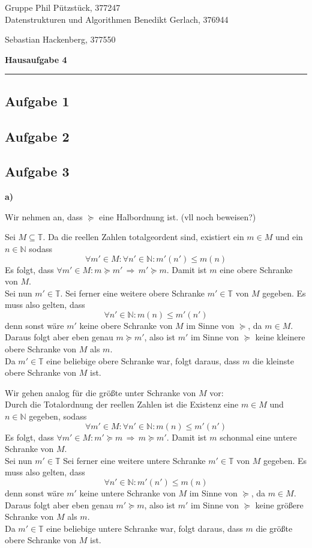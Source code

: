 \documentclass[a4paper,graphics,11pt]{article}
\newcommand{\aufgabe}[1]{\subsection*{Aufgabe #1}}
\begin{document}
\noindent Gruppe              \hfill Phil Pützstück, 377247\\
\noindent Datenstrukturen und Algorithmen \hfill Benedikt Gerlach, 376944\\
\strut\hfill Sebastian Hackenberg, 377550\\
\begin{center}
	\LARGE{\textbf{Hausaufgabe 4}}
\end{center}
\begin{center}
\rule[0.1ex]{\textwidth}{1pt}
\end{center}

\aufgabe{1}
\newpage
\aufgabe{2}
\newpage
\aufgabe{3}
\textbf{a)}

Wir nehmen an, dass $\succeq$ eine Halbordnung ist. (vll noch beweisen?)

Sei $M \subseteq \mathbb{T}$. Da die reellen Zahlen totalgeordent sind, existiert ein
$m \in M$ und ein $n \in \mathbb{N}$ sodass
$$
    \forall m' \in M : \forall n' \in \mathbb{N} : m'(n') \leq m(n)
$$
Es folgt, dass $\forall m' \in M : m \succeq m' \,\Longrightarrow\, m' \succeq m$.
Damit ist $m$ eine obere Schranke von $M$.\\
Sei nun $m' \in \mathbb{T}$. Sei ferner eine weitere obere Schranke $m' \in \mathbb{T}$ von $M$ gegeben.
Es muss also gelten, dass
\begin{equation}
    \forall n' \in \mathbb{N} : m(n) \leq m'(n')
\end{equation}
denn sonst wäre $m'$ keine obere Schranke von $M$ im Sinne von $\succeq$, da $m \in M$.
Daraus folgt aber eben genau $m \succeq m'$, also ist $m'$ im Sinne von $\succeq$ keine 
kleinere obere Schranke von $M$ als $m$.\\
Da $m' \in \mathbb{T}$ eine beliebige obere Schranke war, folgt daraus, dass $m$ die kleinste obere Schranke von $M$ ist.

Wir gehen analog für die größte unter Schranke von $M$ vor:\\
Durch die Totalordnung der reellen Zahlen ist die Existenz eine $m \in M$ und $n \in \mathbb{N}$
gegeben, sodass
$$
    \forall m' \in M : \forall n' \in \mathbb{N} : m(n) \leq m'(n')
$$
Es folgt, dass $\forall m' \in M : m' \succeq m \,\Longrightarrow\, m \succeq m'$. Damit ist $m$ schonmal eine untere Schranke von $M$.\\
Sei nun $m' \in \mathbb{T}$ Sei ferner eine weitere untere Schranke $m' \in \mathbb{T}$ von $M$ gegeben.
Es muss also gelten, dass
$$
    \forall n' \in \mathbb{N} : m'(n') \leq m(n)
$$
denn sonst wäre $m'$ keine untere Schranke von $M$ im Sinne von $\succeq$, da $m \in M$.
Daraus folgt aber eben genau $m' \succeq m$, also ist $m'$ im Sinne von $\succeq$ keine größere
Schranke von $M$ als $m$.\\
Da $m' \in \mathbb{T}$ eine beliebige untere Schranke war, folgt daraus,
dass $m$ die größte obere Schranke von $M$ ist.
\end{document}
